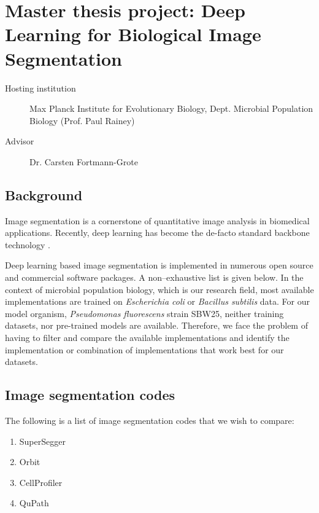 \documentclass[a4paper]{article}
\begin{document}
\section{Master thesis project: Deep Learning for Biological Image Segmentation\label{dlsegbench}}

\begin{description}
    \item[Hosting institution] Max Planck Institute for Evolutionary Biology, Dept. Microbial Population Biology (Prof.
        Paul Rainey)
    \item[Advisor] Dr. Carsten Fortmann-Grote
\end{description}


\subsection{Background}\label{project-description}

Image segmentation is a cornerstone of quantitative image analysis in
biomedical applications. Recently, deep learning \cite{Aggarwal2018} has become the de-facto
standard backbone technology \cite{Valen2016}. 

Deep learning based image segmentation is implemented in numerous open
source and commercial software packages. A non--exhaustive list is given below.
In the context of microbial
population biology, which is our research field, most available
implementations are trained on \textit{Escherichia coli} or \textit{Bacillus subtilis}
data. For our model organism, \textit{Pseudomonas fluorescens} strain SBW25,
neither training datasets, nor pre-trained models are available.
Therefore, we face the problem of having to filter and compare the available implementations and
identify the implementation or combination of implementations that work best for our datasets. 

\subsection{Image segmentation codes}
The following is a list of image segmentation codes that we wish to
compare:

\begin{enumerate}
    \def\labelenumi{\arabic{enumi}.}
    \item
        SuperSegger \cite{Stylianidou2016}
    \item
        Orbit \cite{Stritt2020}
    \item
        CellProfiler \cite{Jones2008}
    \item
        QuPath \cite{Bankhead2017}
\end{enumerate}
\end{document}
